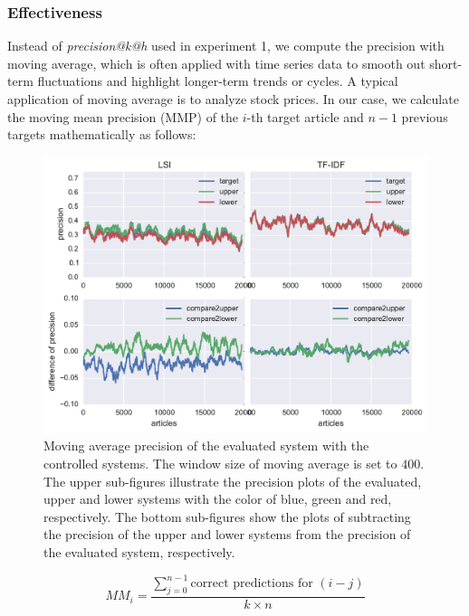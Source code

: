 \subsubsection{Effectiveness}

Instead of \textit{precision@k@h} used in experiment 1, we compute the precision with moving average, which is often applied with time series data to smooth out short-term fluctuations and highlight longer-term trends or cycles. A typical application of moving average is to analyze stock prices. In our case, we calculate the moving mean precision (MMP) of the $i$-th target article and $n-1$ previous targets mathematically as follows:

\begin{figure}[!htb]
    \centering
    \includegraphics[width=\textwidth]{fig/precision_inc}
    \caption[Moving average precision of the evaluated system with the controlled systems]{Moving average precision of the evaluated system with the controlled systems. The window size of moving average is set to $400$. The upper sub-figures illustrate the precision plots of the evaluated, upper and lower systems with the color of blue, green and red, respectively. The bottom sub-figures show the plots of subtracting the precision of the upper and lower systems from the precision of the evaluated system, respectively.}
    \label{fig:predict_inc}
\end{figure}

\clearpage

\begin{equation}
    MM_{i} = \frac{\sum^{n-1}_{j=0} \text{correct predictions for }(i-j)}{k\times n}
\end{equation}


